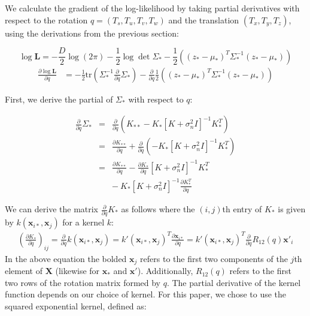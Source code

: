 \documentclass{article} %
\begin{document}
We calculate the gradient of the log-likelihood by taking partial derivatives with respect to the rotation $q = (T_s, T_u,T_v,T_w)$ and the translation $(T_x, T_y, T_z)$, using the derivations from the previous section:

\begin{equation}
\log \mathbf{L} = -\frac{D}{2} \log (2\pi) - \frac{1}{2} \log \det \Sigma_* - \frac{1}{2} \left((z_* - \mu_*)^T \Sigma_*^{-1} (z_* - \mu_*)\right)
\end{equation}
\begin{eqnarray}
\frac{\partial \log \mathbf{L}}{\partial q} &= - \frac{1}{2} \mbox{tr}(\Sigma_*^{-1} \frac{\partial}{\partial q} \Sigma_*)
                - \frac{\partial}{\partial q} \frac{1}{2} \left((z_* - \mu_*)^T \Sigma_*^{-1} (z_* - \mu_*)\right) 
\label{eq-partialq}
\end{eqnarray}

First, we derive the partial of $\Sigma_*$ with respect to $q$:

\begin{eqnarray}
\frac{\partial}{\partial q} \Sigma_* &=& \frac{\partial}{\partial q} (K_{**} - K_*[K + \sigma_n^2 I]^{-1} K_*^T) \nonumber\\
&=& \frac{\partial K_{**}}{\partial q} + \frac{\partial}{\partial q} (- K_*[K + \sigma_n^2 I]^{-1} K_*^T) \nonumber\\
&=& \frac{\partial K_{**}}{\partial q} - \frac{\partial K_*}{\partial q}  \left[K + \sigma_n^2 I\right]^{-1} K_*^T \nonumber\\
&&  - ~ K_* [K + \sigma_n^2 I]^{-1} \frac{\partial K_*^T}{\partial q}  \label{eq-covpartialq}
\end{eqnarray}
 

 We can derive the matrix $\frac{\partial}{\partial q} K_*$ as follows where the $(i,j)$th entry of $K_*$ is given by $k(\mathbf{x}_{i*}, \mathbf{x}_j)$ for a kernel $k$:
\begin{eqnarray}
\left(\frac{\partial K_*}{\partial q}\right)_{ij} = \frac{\partial}{\partial q} k(\mathbf{x}_{i*}, \mathbf{x}_j) = k'(\mathbf{x}_{i*}, \mathbf{x}_j)^T \frac{\partial \mathbf{x}_{i*}}{\partial q}  = k'(\mathbf{x}_{i*}, \mathbf{x}_j)^T \frac{\partial}{\partial q} R_{12}(q)\mathbf{x}'_i
\label{equation:partialKq}
\end{eqnarray}
In the above equation the bolded $\mathbf{x}_j$ refers to the first two components of the $j$th element of $\mathbf{X}$ (likewise for $\mathbf{x_*}$ and $\mathbf{x'}$). Additionally, $R_{12}(q)$ refers to the first two rows of the rotation matrix formed by $q$. The partial derivative of the kernel function depends on our choice of kernel. For this paper, we chose to use the squared exponential kernel, defined as:
\end{document}
